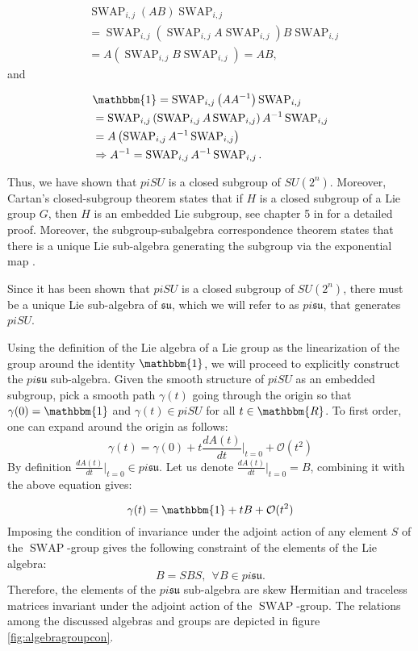\documentclass[%
 reprint,
 amsmath,amssymb,
 aps,
]{revtex4-2}
\newcommand{\SWAP}{\operatorname{SWAP}}
\theoremstyle{definition}%
\begin{document}
\begin{align*}
    & \SWAP_{i,j} \left( AB\right) \SWAP_{i,j}\\
     &=\SWAP_{i,j} \left( \SWAP_{i,j} A \SWAP_{i,j} \right)B \SWAP_{i,j}\\
     & = A \left (\SWAP_{i,j} B \SWAP_{i,j} \right)= AB,
\end{align*}
and

\begin{align*}
    & \mathbbm{1}= \SWAP_{i,j} \left( A A^{-1}\right) \SWAP_{i,j}\\
    & =  \SWAP_{i,j} \left( \SWAP_{i,j} A \SWAP_{i,j} \right) A^{-1}\SWAP_{i,j}\\
    & = A \left( \SWAP_{i,j} A^{-1} \SWAP_{i,j} \right)\\
    & \Rightarrow A^{-1}= \SWAP_{i,j} A^{-1} \SWAP_{i,j}.
\end{align*}

 Thus, we have shown that $piSU$ is a closed subgroup of $SU(2^n)$. Moreover, Cartan's closed-subgroup theorem states that if $H$ is a closed subgroup of a Lie group $G$, then $H$ is an embedded Lie subgroup, see chapter 5 in \cite{lee_introduction_2012} for a detailed proof. Moreover, the subgroup-subalgebra correspondence theorem states that there is a unique Lie sub-algebra generating the subgroup via the exponential map \cite{lee_introduction_2012}.

Since it has been shown that $piSU$ is a closed subgroup of $SU(2^n)$, there must be a unique Lie sub-algebra of $\mathfrak{su}$, which we will refer to as $pi\mathfrak{su}$, that generates $piSU$.

Using the definition of the Lie algebra of a Lie group as the linearization of the group around the identity $\mathbbm{1}$, we will proceed to explicitly construct the $pi\mathfrak{su}$ sub-algebra. Given the smooth structure of $piSU$ as an embedded subgroup, pick a smooth path $\gamma(t)$ going through the origin so that $\gamma(0)=\mathbbm{1}$ and $\gamma(t) \in piSU$ for all $t \in \mathbbm{R}$. To first order, one can expand around the origin as follows:
\begin{equation}
    \gamma(t)= \gamma(0)+ t \frac{d A(t)}{dt}|_{t=0}+ \mathcal{O}(t^2)
\end{equation}
By definition $\frac{d A(t)}{dt}|_{t=0} \in pi\mathfrak{su}$. Let us denote $\frac{d A(t)}{dt}|_{t=0}=B$, combining it with the above equation gives:

\begin{equation}
    \gamma(t)= \mathbbm{1}+tB+\mathcal{O}(t^2)
\end{equation}
Imposing the condition of invariance under the adjoint action of any element $S$ of the $\operatorname{SWAP}$-group gives the following constraint of the elements of the Lie algebra:
\begin{equation}
    B=SBS, \  \ \forall B \in pi\mathfrak{su}.
\end{equation}
Therefore, the elements of the $pi\mathfrak{su}$ sub-algebra are skew Hermitian and traceless matrices invariant under the adjoint action of the $\operatorname{SWAP}$-group. The relations among the discussed algebras and groups are depicted in figure \ref{fig:algebragroupcon}.
\end{document}
